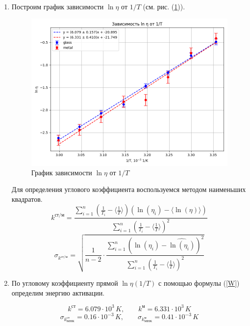 \documentclass[a4paper,12pt]{article} %
\begin{document}
\begin{enumerate}
  \item Построим график зависимости $\ln \eta$ от $1/T$ (см. рис. (\ref{fig:eta1T})).
  
	\begin{figure}[h]
		\centering
		\includegraphics[scale = 0.75]{graph.png}
		\caption{График зависимости $\ln \eta$ от $1/T$}
		\label{fig:eta1T}
	\end{figure}
  
	Для определения углового коэффициента воспользуемся методом наименьших квадратов. 
	\begin{equation}
		k^\text{ст/м} = \frac{\sum_{i=1}^{n} \left(\frac{1}{T_i} - \langle \frac{1}{T} \rangle \right) \left(\ln(\eta_i) - \langle \ln(\eta) \rangle \right)}{\sum_{i=1}^{n} \left(\frac{1}{T_i} - \langle \frac{1}{T} \rangle \right)^2}
	\end{equation}
	\begin{equation}
		\sigma_{k^\text{ст/м}} = \sqrt{\frac{1}{n-2} \cdot \frac{\sum_{i=1}^{n} \left( \ln(\eta_i) - \hat{\ln(\eta_i)} \right)^2}{\sum_{i=1}^{n} \left( \frac{1}{T_i} - \langle \frac{1}{T} \rangle \right)^2}}
	\end{equation}	
  \item По угловому коэффициенту прямой $\ln \eta (1/T)$ с помощью формулы (\ref{W}) определим энергию активации. 
  
	\begin{equation}
		k^{\text{ст}} = 6.079 \cdot 10^{3} \, K, \qquad k^{\text{м}} = 6.331 \cdot 10^{3} \, K
	\end{equation}
	\begin{equation}
		\sigma_{k^{\text{ст}}_\text{МНК}} = 0.16 \cdot 10^{-3} \, K, \qquad \sigma_{k^{\text{м}}_\text{МНК}} = 0.41 \cdot 10^{-3} \, K
	\end{equation}


\end{enumerate}
\end{document}
